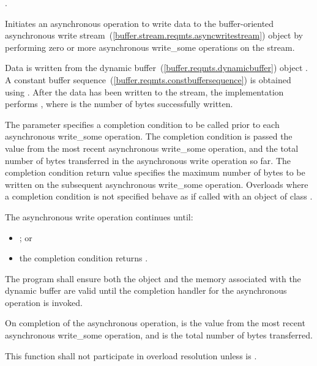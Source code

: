 \begin{itemdescr}
\pnum
\completionsig {}.

\pnum
\effects Initiates an asynchronous operation to write data to the buffer-oriented asynchronous write stream~(\ref{buffer.stream.reqmts.asyncwritestream}) object  by performing zero or more asynchronous write_some operations on the stream.

\pnum
Data is written from the dynamic buffer~(\ref{buffer.reqmts.dynamicbuffer}) object . A constant buffer sequence~(\ref{buffer.reqmts.constbuffersequence}) is obtained using . After the data has been written to the stream, the implementation performs , where  is the number of bytes successfully written.

\pnum
The  parameter specifies a completion condition to be called prior to each asynchronous write_some operation. The completion condition is passed the  value from the most recent asynchronous write_some operation, and the total number of bytes transferred in the asynchronous write operation so far. The completion condition return value specifies the maximum number of bytes to be written on the subsequent asynchronous write_some operation. Overloads where a completion condition is not specified behave as if called with an object of class .

\pnum
The asynchronous write operation continues until:

\begin{itemize}
\item {}; or
\item the completion condition returns .
\end{itemize}

\pnum
The program shall ensure both the  object  and the memory associated with the dynamic buffer  are valid until the completion handler for the asynchronous operation is invoked.

\pnum
On completion of the asynchronous operation,  is the  value from the most recent asynchronous write_some operation, and  is the total number of bytes transferred.

\pnum
\remarks This function shall not participate in overload resolution unless  is .
\end{itemdescr}



